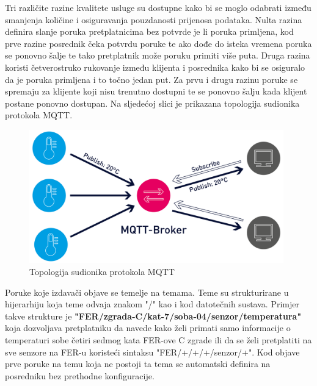 \documentclass[times, utf8, diplomski]{fer}
\begin{document}
Tri različite razine kvalitete usluge su dostupne kako bi se moglo odabrati između smanjenja količine i osiguravanja pouzdanosti prijenosa podataka. Nulta razina definira slanje poruka pretplatnicima bez potvrde je li poruka primljena, kod prve razine posrednik čeka potvrdu poruke te ako dođe do isteka vremena poruka se ponovno šalje te tako pretplatnik može poruku primiti više puta. Druga razina koristi četverostruko rukovanje između klijenta i posrednika kako bi se osiguralo da je poruka primljena i to točno jedan put. Za prvu i drugu razinu poruke se spremaju za klijente koji nisu trenutno dostupni te se ponovno šalju kada klijent postane ponovno dostupan. Na sljedećoj slici je prikazana topologija sudionika protokola MQTT.
\begin{figure}[htb]
    \centering
    \includegraphics[width=11cm]{images/mqtt.png}
    \caption{Topologija sudionika protokola MQTT\citep{MQTT}}
    \label{fig:mqtt}
\end{figure}

Poruke koje izdavači objave se temelje na temama. Teme su strukturirane u hijerarhiju koja teme odvaja znakom "/" kao i kod datotečnih sustava. Primjer takve strukture je \textbf{"FER/zgrada-C/kat-7/soba-04/senzor/temperatura"} koja dozvoljava pretplatniku da navede kako želi primati samo informacije o temperaturi sobe četiri sedmog kata FER-ove C zgrade ili da se želi pretplatiti na sve senzore na FER-u koristeći sintaksu "FER/+/+/+/senzor/+". Kod objave prve poruke na temu koja ne postoji ta tema se automatski definira na posredniku bez prethodne konfiguracije.
\end{document}
